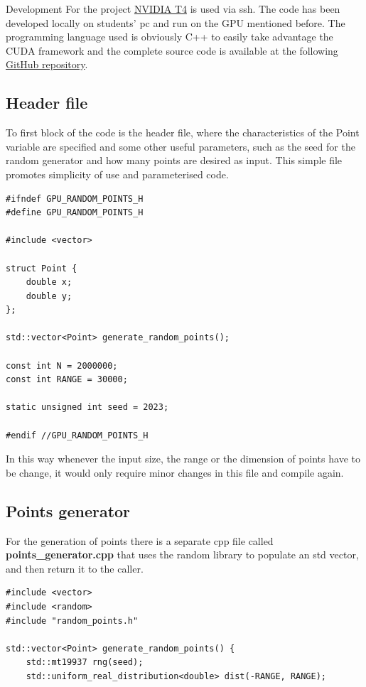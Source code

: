 \documentclass[a4paper,oneside,11pt,DIV12,headsepline,footexclude,headexclude]{scrartcl}
\begin{document}
\begin{section}{Development}
For the project \href{https://www.nvidia.com/en-us/data-center/tesla-t4/}{NVIDIA T4} is used via ssh. The code has been developed locally on students' pc and run on the GPU mentioned before. The programming language used is obviously C++ to easily take advantage the CUDA framework and the complete source code is available at the following \href{https://github.com/cima22/CUDA_PlanarConvexHull/tree/main}{GitHub repository}.
\subsection{Header file}
To first block of the code is the header file, where the characteristics of the Point variable are specified and some other useful parameters, such as the seed for the random generator and how many points are desired as input. This simple file promotes simplicity of use and parameterised code.
\lstset{language=C++}
\begin{lstlisting}[caption={Header file.}, captionpos=b]
#ifndef GPU_RANDOM_POINTS_H
#define GPU_RANDOM_POINTS_H

#include <vector>

struct Point {
    double x;
    double y;
};

std::vector<Point> generate_random_points();

const int N = 2000000;
const int RANGE = 30000;

static unsigned int seed = 2023;

#endif //GPU_RANDOM_POINTS_H
\end{lstlisting}
In this way whenever the input size, the range or the dimension of points have to be change, it would only require minor changes in this file and compile again.
\subsection{Points generator}
For the generation of points there is a separate cpp file called \textbf{points\_generator.cpp} that uses the random library to populate an std vector, and then return it to the caller.
\lstset{language=C++}
\begin{lstlisting}[caption={Random points generator.}, captionpos=b]
#include <vector>
#include <random>
#include "random_points.h"

std::vector<Point> generate_random_points() {
    std::mt19937 rng(seed);
    std::uniform_real_distribution<double> dist(-RANGE, RANGE);


\end{lstlisting}
\end{section}
\end{document}
